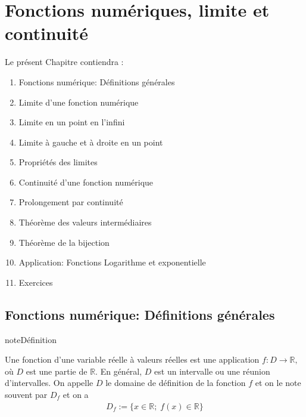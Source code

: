 \documentclass[letterpaper,10pt,french]{jupyterBook}
\begin{document}
\chapter{Fonctions numériques, limite et continuité}
\label{\detokenize{limitefct:fonctions-numeriques-limite-et-continuite}}\label{\detokenize{limitefct::doc}}
\sphinxAtStartPar
Le présent Chapitre contiendra :
\begin{enumerate}
%
\item {} 
\sphinxAtStartPar
Fonctions numérique: Définitions générales

\item {} 
\sphinxAtStartPar
Limite d’une fonction numérique

\item {} 
\sphinxAtStartPar
Limite en un point en l’infini

\item {} 
\sphinxAtStartPar
Limite à gauche et à droite en un point

\item {} 
\sphinxAtStartPar
Propriétés des limites

\item {} 
\sphinxAtStartPar
Continuité d’une fonction numérique

\item {} 
\sphinxAtStartPar
Prolongement par continuité

\item {} 
\sphinxAtStartPar
Théorème des valeurs intermédiaires

\item {} 
\sphinxAtStartPar
Théorème de la bijection

\item {} 
\sphinxAtStartPar
Application: Fonctions Logarithme et exponentielle

\item {} 
\sphinxAtStartPar
Exercices

\end{enumerate}


\section{Fonctions numérique: Définitions générales}
\label{\detokenize{limitefcts:fonctions-numerique-definitions-generales}}\label{\detokenize{limitefcts::doc}}
\begin{sphinxadmonition}{note}{Définition}

\sphinxAtStartPar
Une fonction d’une variable réelle à valeurs réelles est une application \(f:D\rightarrow\mathbb{R},\) où \(D\) est une partie de \(\mathbb{R}.\) En général, \(D\) est un intervalle ou une réunion d’intervalles. On appelle \(D\) le domaine de définition de la fonction \(f\) et on le note souvent par \(D_f\) et on a
\begin{equation*}
\begin{split}
D_f:=\{x\in \mathbb{R};\;f(x)\in \mathbb{R}\}
\end{split}
\end{equation*}\end{sphinxadmonition}
\end{document}
